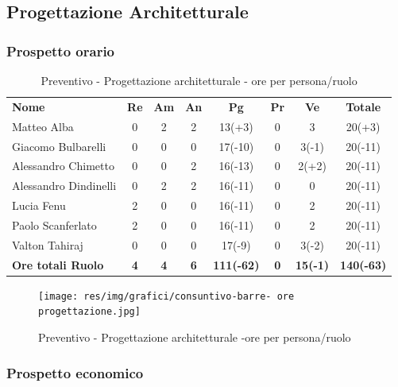 \newpage
\subsection{Progettazione Architetturale}
\subsubsection{Prospetto orario}

\begin{table} [h!]
	\begin{center}
		\begin{tabular} { m{3.5cm} c c c c c c c }
			\rowcolor{lightgray}
			\textbf{Nome} & \textbf{Re} & \textbf{Am} & \textbf{An} & \textbf{Pg} & \textbf{Pr} & \textbf{Ve} & \textbf{Totale} \\
			Matteo Alba & 0 & 2 & 2 & 13(+3) & 0 & 3 & 20(+3) \\
			Giacomo Bulbarelli & 0 & 0 & 0 & 17(-10) & 0 & 3(-1) & 20(-11) \\
			Alessandro Chimetto & 0 & 0 & 2 & 16(-13) & 0 & 2(+2) & 20(-11) \\
			Alessandro Dindinelli & 0 & 2 & 2 & 16(-11) & 0 & 0 & 20(-11) \\
			Lucia Fenu & 2 & 0 & 0 & 16(-11) & 0 & 2 & 20(-11) \\
			Paolo Scanferlato & 2 & 0 & 0 & 16(-11) & 0 & 2 & 20(-11) \\
			Valton Tahiraj & 0 & 0 & 0 & 17(-9) & 0 & 3(-2) & 20(-11)\\
			\textbf{Ore totali Ruolo} & \textbf{4} & \textbf{4} & \textbf{6} & \textbf{111(-62)} & \textbf{0}& \textbf{15(-1)} & \textbf{140(-63)}
		\end{tabular}
		\caption{Preventivo - Progettazione architetturale - ore per persona/ruolo}
	\end{center}
\end{table}

\begin{figure} [h!]
	\centering
	\texttt{[image: res/img/grafici/consuntivo-barre- ore progettazione.jpg]}
	\caption{Preventivo - Progettazione architetturale -ore per persona/ruolo} 
\end{figure}

\newpage

\subsubsection{Prospetto economico}

